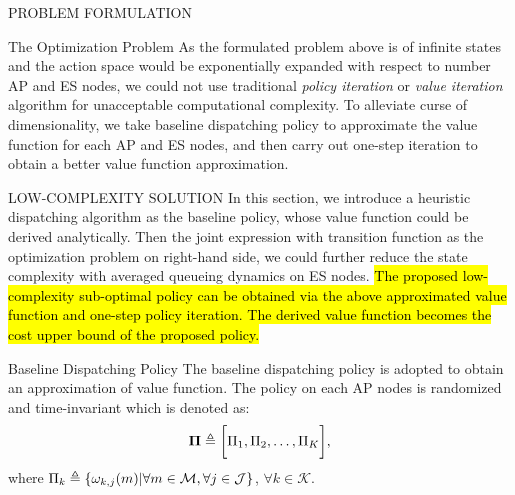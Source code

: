 \documentclass[10pt, conference, letterpaper]{IEEEtran}
\newcommand{\define}{\triangleq}
\renewcommand{\vec}{\mathbf}
\DeclarePairedDelimiter{\set}{\{}{\}}
\DeclarePairedDelimiter{\Bracket}{\bigg[}{\bigg]}
\newcommand{\apSet}{\mathcal{K}}
\newcommand{\esSet}{\mathcal{M}}
\newcommand{\jSpace}{\mathcal{J}}
\begin{document}
\begin{section}{PROBLEM FORMULATION}
\begin{subsection}{The Optimization Problem}
            As the formulated problem above is of infinite states and the action space would be exponentially expanded with respect to number AP and ES nodes, we could not use traditional \emph{policy iteration} or \emph{value iteration} algorithm \cite{sutton1998introduction} for unacceptable computational complexity. To alleviate curse of dimensionality, we take baseline dispatching policy to approximate the value function for each AP and ES nodes, and then carry out one-step iteration to obtain a better value function approximation.
        \end{subsection}
    \end{section}

    \begin{section}{LOW-COMPLEXITY SOLUTION}
        \label{sec:algorithm}
        In this section, we introduce a heuristic dispatching algorithm as the baseline policy, whose value function could be derived analytically. Then the joint expression with transition function as the optimization problem on right-hand side, we could further reduce the state complexity with averaged queueing dynamics on ES nodes.
        \hl{The proposed low-complexity sub-optimal policy can be obtained via the above approximated value function and one-step policy iteration. The derived value function becomes the cost upper bound of the proposed policy.}

        \begin{subsection}{Baseline Dispatching Policy}
            The baseline dispatching policy is adopted to obtain an approximation of value function. The policy on each AP nodes is randomized and time-invariant which is denoted as:
            \begin{align}
                \vec{\Pi} \define \Bracket{\Pi_1, \Pi_2, \dots, \Pi_K},
            \end{align}
            where $\Pi_k \define \set{\omega_{k,j}(m)|\forall m\in\esSet,\forall j\in\jSpace}$, $\forall k\in\apSet$.


\end{subsection}
\end{section}
\end{document}
